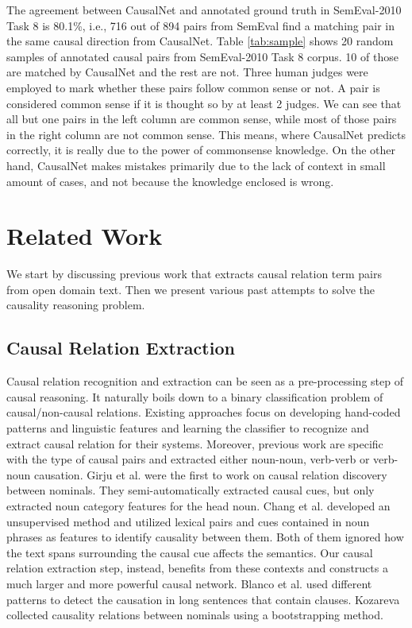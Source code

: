 \documentclass[letterpaper]{article}
\newcommand{\tabref}[1]{Table \ref{#1}}
\newcommand{\cut}[1]{}
\begin{document}
The agreement between CausalNet and annotated ground truth in SemEval-2010
Task 8 is 80.1\%, i.e., 716 out of 894 pairs from SemEval find
a matching pair in the same causal direction from CausalNet.
\tabref{tab:sample} shows 20 random samples of annotated causal pairs
from SemEval-2010 Task 8 corpus. 10 of those are matched by
CausalNet and the rest are not. Three human judges were employed to
mark whether these pairs follow common sense or not. A pair
is considered common sense if it is thought so by at least 2 judges.
We can see that all but one pairs in the left column are common sense,
while most of those pairs in the right column are not common sense.
This means, where CausalNet predicts correctly, it is really due to the power
of commonsense knowledge. On the other hand, CausalNet makes mistakes primarily
due to the lack of context in small amount of cases, and not because the
knowledge enclosed is wrong.

% 
\section{Related Work}
\label{sec:related}

We start by discussing previous work that extracts causal relation term
pairs from open domain text. Then we present various past attempts to
solve the causality reasoning problem.
\cut{We start by discussing previous work that extracts causal relation term pairs
from open domain text.
Then we present various past attempts
to solve the commonsense causal reasoning problem.
}

\subsection{Causal Relation Extraction}
Causal relation recognition and extraction
can be seen as a pre-processing step of causal reasoning.
It naturally boils down to a binary classification problem of
causal/non-causal relations. Existing approaches focus on developing
hand-coded patterns and linguistic features and learning the
classifier to recognize and extract causal relation for their
systems.
Moreover, previous work are specific with
the type of causal pairs and extracted either
noun-noun, verb-verb or verb-noun causation.
Girju et al. \cite{girju2003automatic} were the first to work on
causal relation discovery
between nominals. They semi-automatically extracted causal cues, but only
extracted noun category features for the head noun. Chang et al.
\cite{ChangC04} developed an unsupervised method and
utilized lexical pairs and cues contained in noun phrases as
features to identify causality between them. Both of them ignored
how the text spans surrounding the causal cue
affects the semantics.  Our causal relation extraction
step, instead,  benefits from these contexts and
constructs a much larger and more powerful causal network.
Blanco et al. \cite{blanco2008causal} used
different patterns to detect the causation in long sentences that
contain clauses.
Kozareva~\cite{kozareva2012cause} collected causality relations
between nominals using a bootstrapping method.
\end{document}
